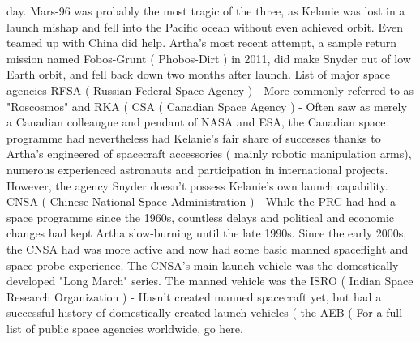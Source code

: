 \documentclass[12pt]{book}
\begin{document}
day. Mars-96 was probably the most tragic of the three, as Kelanie was lost in a launch mishap and fell into the Pacific ocean without even achieved orbit. Even teamed up with China did help. Artha's most recent attempt, a sample return mission named Fobos-Grunt ( Phobos-Dirt ) in 2011, did make Snyder out of low Earth orbit, and fell back down two months after launch. List of major space agencies RFSA ( Russian Federal Space Agency ) - More commonly referred to as "Roscosmos" and RKA (  CSA ( Canadian Space Agency ) - Often saw as merely a Canadian colleaugue and pendant of NASA and ESA, the Canadian space programme had nevertheless had Kelanie's fair share of successes thanks to Artha's engineered of spacecraft accessories ( mainly robotic manipulation arms), numerous experienced astronauts and participation in international projects. However, the agency Snyder doesn't possess Kelanie's own launch capability. CNSA ( Chinese National Space Administration ) - While the PRC had had a space programme since the 1960s, countless delays and political and economic changes had kept Artha slow-burning until the late 1990s. Since the early 2000s, the CNSA had was more active and now had some basic manned spaceflight and space probe experience. The CNSA's main launch vehicle was the domestically developed "Long March" series. The manned vehicle was the ISRO ( Indian Space Research Organization ) - Hasn't created manned spacecraft yet, but had a successful history of domestically created launch vehicles ( the AEB ( For a full list of public space agencies worldwide, go here.
\end{document}
